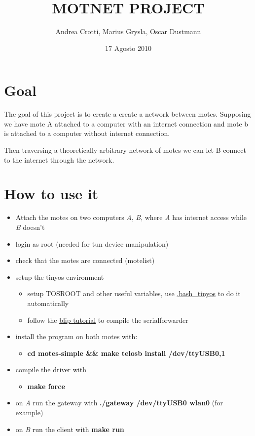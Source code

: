\documentclass[11pt]{article}
\title{MOTNET PROJECT}
\author{Andrea Crotti, Marius Grysla, Oscar Dustmann}
\date{17 Agosto 2010}
\begin{document}
\maketitle


\section*{Goal}
\label{sec-1}

  The goal of this project is to create a create a network between motes.
  Supposing we have mote A attached to a computer with an internet connection and mote b is attached to a computer without internet connection.

  Then traversing a theoretically arbitrary network of motes we can let B connect to the internet through the network.
\section*{How to use it}
\label{sec-2}

\begin{itemize}
\item Attach the motes on two computers \emph{A}, \emph{B}, where \emph{A} has internet access while \emph{B} doesn't
\item login as root (needed for tun device manipulation)
\item check that the motes are connected (motelist)
\item setup the tinyos environment

\begin{itemize}
\item setup TOSROOT and other useful variables, use \href{http://www.5secondfuse.com/tinyos/.bash_tinyos}{.bash\_tinyos} to do it automatically
\item follow the \href{http://docs.tinyos.net/index.php/BLIP_Tutorial}{blip tutorial} to compile the serialforwarder
\end{itemize}

\item install the program on both motes with:

\begin{itemize}
\item \textbf{cd motes-simple \&\& make telosb install /dev/ttyUSB0,1}
\end{itemize}

\item compile the driver with

\begin{itemize}
\item \textbf{make force}
\end{itemize}

\item on \emph{A} run the gateway with \textbf{./gateway /dev/ttyUSB0 wlan0} (for example)
\item on \emph{B} run the client with \textbf{make run}
\end{itemize}
\end{document}
